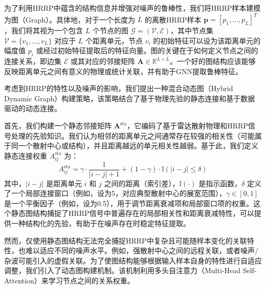 为了利用HRRP中蕴含的结构信息并增强对噪声的鲁棒性，我们将HRRP样本建模为图（Graph）。具体地，对于一个长度为 $L$ 的离散HRRP样本 $\mathbf{p} = [p_1, \dots, p_L]^T$，我们将其视为一个包含 $L$ 个节点的图 $\mathcal{G} = (\mathcal{V}, \mathcal{E})$，其中节点集 $\mathcal{V} = \{v_1, \dots, v_L\}$ 对应于 $L$ 个距离单元，节点 $v_i$ 的初始特征可以设为该距离单元的幅度值 $p_i$ 或经过初始特征提取后的特征向量。图的关键在于如何定义节点之间的连接关系，即边集 $\mathcal{E}$ 或其对应的邻接矩阵 $\mathbf{A} \in \mathbb{R}^{L \times L}$。一个好的图结构应该能够反映距离单元之间有意义的物理或统计关联，并有助于GNN提取鲁棒特征。

考虑到HRRP的特性以及噪声的影响，我们提出一种混合动态图（Hybrid Dynamic Graph）构建策略，该策略结合了基于物理先验的静态连接和基于数据驱动的动态连接。

首先，我们构建一个静态邻接矩阵 $\mathbf{A}^{\text{sta}}$，它编码了基于雷达散射物理和HRRP信号处理的先验知识。我们认为相邻的距离单元之间通常存在较强的相关性（可能属于同一个散射中心或结构），并且距离越远的单元相关性越弱。基于此，我们定义静态连接权重 $A^{\text{sta}}_{ij}$ 为：
\begin{equation}
    A^{\text{sta}}_{ij} = \gamma \cdot \frac{1}{|i-j|+1} + (1-\gamma) \cdot \mathbb{I}(|i-j| \leq \delta)
    \label{eq:static_adjacency}
\end{equation}
其中，$|i-j|$ 是距离单元 $i$ 和 $j$ 之间的距离（索引差），$\mathbb{I}(\cdot)$ 是指示函数，$\delta$ 定义了一个局部连接窗口（例如，设为5，对应典型散射中心的展宽范围），$\gamma \in [0,1]$ 是一个平衡因子（例如，设为0.5），用于调节距离衰减项和局部窗口项的权重。这个静态图结构捕捉了HRRP信号中普遍存在的局部相关性和距离衰减特性，可以提供一种结构化的先验，有助于在噪声存在时稳定特征提取。

然而，仅使用静态图结构无法完全捕捉HRRP中复杂且可能随样本变化的关联特性，也难以适应不同的噪声水平。例如，强散射中心之间的远程关联，或者噪声/杂波可能引入的虚假关联。为了使图结构能够根据输入样本自身的特性进行自适应调整，我们引入了动态图构建机制。该机制利用多头自注意力（Multi-Head Self-Attention）来学习节点之间的关系权重。


